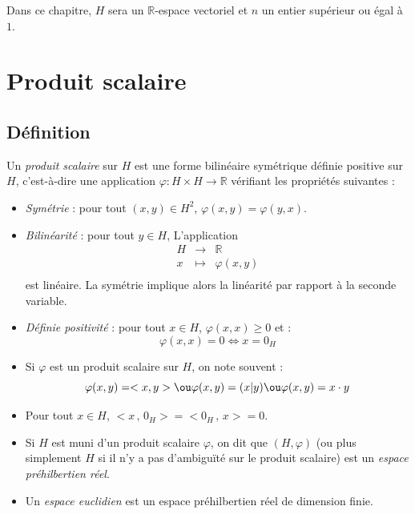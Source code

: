 \documentclass[french,11pt,twoside]{VcCours}
\begin{document}

\tableofcontents
\separationTitre


Dans ce chapitre, $H$ sera un $\mathbb{R}$-espace vectoriel et $n$ un entier supérieur ou égal à $1$.

\section{Produit scalaire}
\subsection{Définition}
\begin{Definition}{} Un \emph{produit scalaire} sur $H$ est une forme bilinéaire symétrique définie positive sur $H$, c'est-à-dire une application $\varphi : H \times H \rightarrow \mathbb{R}$ vérifiant les propriétés suivantes :

\begin{itemize}
\item \emph{Symétrie} : pour tout $(x,y) \in H^2$, $\varphi(x,y)= \varphi(y,x)$.
\item \emph{Bilinéarité} : pour tout $y \in H$, L'application 
$$ \begin{array}{ccl}
H & \rightarrow & \mathbb{R} \\
x & \mapsto & \varphi(x,y) \\
\end{array}$$
est linéaire. La symétrie implique alors la linéarité par rapport à la seconde variable.
\item \emph{Définie positivité} : pour tout $x \in H$, $\varphi(x,x) \geq 0$ et :
$$ \varphi(x,x) = 0 \Longleftrightarrow x = 0_H $$
\end{itemize}
\end{Definition}

\begin{Remarques}{}
\begin{itemize}
\item Si $\varphi$ est un produit scalaire sur $H$, on note souvent :
$$ \varphi(x,y) = <x,y>  \ou \varphi(x,y) = (x \vert y) \ou \varphi(x,y)=x \cdot y$$
\item Pour tout $x \in H$, $<x  \,  , \, 0_H > =<0_H  \,  , \, x > = 0$.
\end{itemize}
\end{Remarques}

\begin{Definition}{} 
\begin{itemize}
\item Si $H$ est muni d'un produit scalaire $\varphi$, on dit que $(H, \varphi)$ (ou plus simplement $H$ si il n'y a pas d'ambiguïté sur le produit scalaire) est un \emph{espace préhilbertien réel}.
\item Un\emph{ espace euclidien} est un espace préhilbertien réel de dimension finie.
\end{itemize}
\end{Definition}
\end{document}
